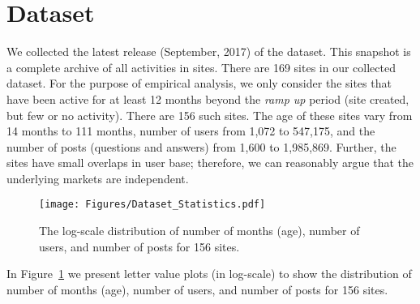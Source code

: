 \section{Dataset} 
We collected the latest release (September, 2017) of the  dataset. This snapshot is a complete archive of all activities in  sites. There are 169 sites in our collected dataset. For the purpose of empirical analysis, we only consider the sites that have been active for at least 12 months beyond the \emph{ramp up} period (site created, but few or no activity). There are 156 such sites. The age of these sites vary from 14 months to 111 months, number of users from 1,072 to 547,175, and the number of posts (questions and answers) from 1,600 to 1,985,869. Further, the sites have small overlaps in user base; therefore, we can reasonably argue that the underlying markets are independent. 

\begin{figure}[hbt]
\centering
\texttt{[image: Figures/Dataset\_Statistics.pdf]}
\caption{The log-scale distribution of number of months (age), number of users, and number of posts for 156  sites.}
\label{fig:dataset}
\end{figure}

In Figure~\ref{fig:dataset} we present letter value plots (in log-scale) to show the distribution of number of months (age), number of users, and number of posts for 156  sites. 